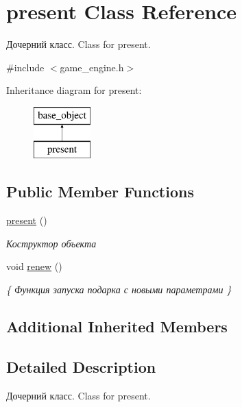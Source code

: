 \hypertarget{classpresent}{}\section{present Class Reference}
\label{classpresent}


Дочерний класс. Class for present.  




{\ttfamily \#include $<$game\+\_\+engine.\+h$>$}

Inheritance diagram for present\+:\begin{figure}[H]
\begin{center}
\leavevmode
\includegraphics[height=2.000000cm]{classpresent}
\end{center}
\end{figure}
\subsection*{Public Member Functions}
\begin{DoxyCompactItemize}
\item 
\mbox{\label{classpresent_a06bf3a0b515b081093a6c3fdc10de80e}} 
\mbox{\hyperlink{classpresent_a06bf3a0b515b081093a6c3fdc10de80e}{present}} ()
\begin{DoxyCompactList}\small\item\em Коструктор объекта \end{DoxyCompactList}\item 
\mbox{\label{classpresent_a991ff8f7047cd6ab6e04b0935e9fba8c}} 
void \mbox{\hyperlink{classpresent_a991ff8f7047cd6ab6e04b0935e9fba8c}{renew}} ()
\begin{DoxyCompactList}\small\item\em \{ Функция запуска подарка с новыми параметрами \} \end{DoxyCompactList}\end{DoxyCompactItemize}
\subsection*{Additional Inherited Members}


\subsection{Detailed Description}
Дочерний класс. Class for present. 

